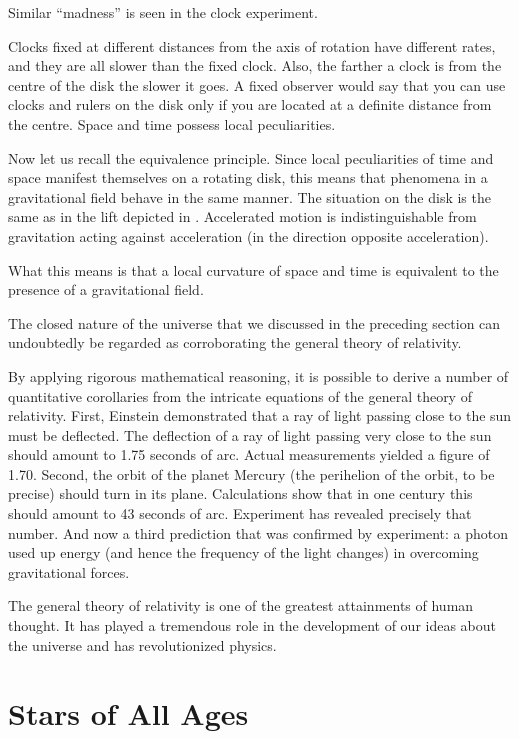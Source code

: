 Similar ``madness'' is seen in the clock experiment.


Clocks fixed at different distances from the axis of rota­tion have different rates, and they are all slower than the fixed clock. Also, the farther a clock is from the centre of the disk the slower it goes. A fixed observer would say that you can use clocks and rulers on the disk only if you are located at a definite distance from the centre. Space and time possess local peculiarities.

Now let us recall the equivalence principle. Since local peculiarities of time and space manifest themselves on a rotating disk, this means that phenomena in a gravita­tional field behave in the same manner. The situation on the disk is the same as in the lift depicted in . Accelerated motion is indistinguishable from gravitation acting against acceleration (in the direction opposite ac­celeration).

What this means is that a local curvature of space and time is equivalent to the presence of a gravitational field.

The closed nature of the universe that we discussed in the preceding section can undoubtedly be regarded as corroborating the general theory of relativity.

By applying rigorous mathematical reasoning, it is possible to derive a number of quantitative corollaries from the intricate equations of the general theory of relativity. First, Einstein demonstrated that a ray of light passing close to the sun must be deflected. The deflection of a ray of light passing very close to the sun should amount to 1.75 seconds of arc. Actual measure­ments yielded a figure of 1.70. Second, the orbit of the planet Mercury (the perihelion of the orbit, to be precise) should turn in its plane. Calculations show that in one century this should amount to 43 seconds of arc. Experi­ment has revealed precisely that number. And now a third prediction that was confirmed by experiment: a photon used up energy (and hence the frequency of the light changes) in overcoming gravitational forces.

The general theory of relativity is one of the greatest attainments of human thought. It has played a tremen­dous role in the development of our ideas about the universe and has revolutionized physics.

\section{Stars of All Ages}

